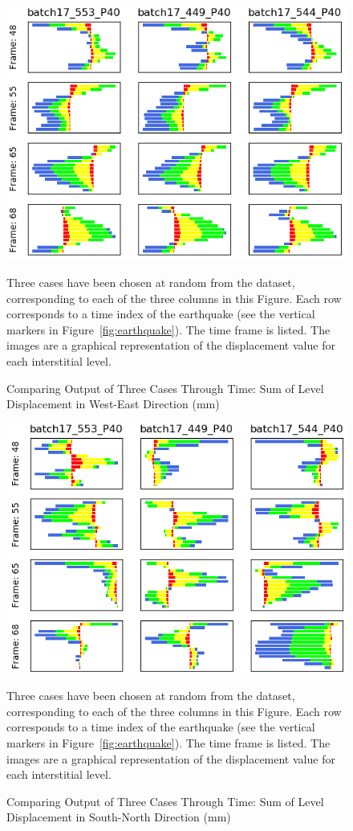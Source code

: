 \begin{figure}[p]
	\centering
	\includegraphics[scale=0.6]{Figures/level_results1.png}
	\caption{Comparing Output of Three Cases Through Time: Sum of Level Displacement in West-East Direction (mm) } {Three cases have been chosen at random from the dataset, corresponding to each of the three columns in this Figure. Each row corresponds to a time index of the earthquake (see the vertical markers in Figure~\ref{fig:earthquake}). The time frame is listed. The images are a graphical representation of the displacement value for each interstitial level.}
	\label{fig:levels1}
\end{figure}

\begin{figure}[p]
	\centering
	\includegraphics[scale=0.6]{Figures/level_results2.png}
	\caption{Comparing Output of Three Cases Through Time: Sum of Level Displacement in South-North Direction (mm) } { Three cases have been chosen at random from the dataset, corresponding to each of the three columns in this Figure. Each row corresponds to a time index of the earthquake (see the vertical markers in Figure~\ref{fig:earthquake}). The time frame is listed. The images are a graphical representation of the displacement value for each interstitial level.}
	\label{fig:levels2}
\end{figure}


